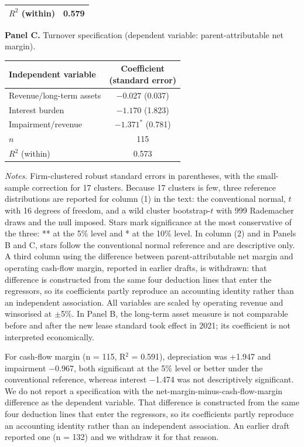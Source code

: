 \documentclass[review,3p,times]{elsarticle}
\begin{document}
\begin{table}[!htbp]
\begin{minipage}{\textwidth}
\begin{tabular}{@{}lc@{}}
$R^{2}$ (within) & 0.579 \\
\bottomrule
\end{tabular}
\par\medskip
\textbf{Panel C.} Turnover specification (dependent variable: parent-attributable net margin).
\par\smallskip
\begin{tabular}{@{}lc@{}}
\toprule
Independent variable & \shortstack{Coefficient\\(standard error)} \\
\midrule
Revenue/long-term assets & \shortstack{$-0.027$\\ (0.037)} \\
Interest burden & \shortstack{$-1.170$\\ (1.823)} \\
Impairment/revenue & \shortstack{$-1.371^{*}$\\ (0.781)} \\
$n$ & 115 \\
$R^{2}$ (within) & 0.573 \\
\bottomrule
\end{tabular}
\par\medskip
\raggedright
\noindent\textit{Notes.} Firm-clustered robust standard errors in parentheses, with the small-sample correction for 17 clusters. Because 17 clusters is few, three reference distributions are reported for column (1) in the text: the conventional normal, $t$ with 16 degrees of freedom, and a wild cluster bootstrap-$t$ with 999 Rademacher draws and the null imposed. Stars mark significance at the most conservative of the three: ** at the 5\% level and * at the 10\% level. In column (2) and in Panels B and C, stars follow the conventional normal reference and are descriptive only. A third column using the difference between parent-attributable net margin and operating cash-flow margin, reported in earlier drafts, is withdrawn: that difference is constructed from the same four deduction lines that enter the regressors, so its coefficients partly reproduce an accounting identity rather than an independent association. All variables are scaled by operating revenue and winsorised at $\pm$5\%. In Panel B, the long-term asset measure is not comparable before and after the new lease standard took effect in 2021; its coefficient is not interpreted economically.
\end{minipage}
\end{table}

For cash-flow margin (n = 115, R\ensuremath{^2} = 0.591), depreciation was +1.947 and impairment \ensuremath{-}0.967, both significant at the 5\% level or better under the conventional reference, whereas interest \ensuremath{-}1.474 was not descriptively significant. We do not report a specification with the net-margin-minus-cash-flow-margin difference as the dependent variable. That difference is constructed from the same four deduction lines that enter the regressors, so its coefficients partly reproduce an accounting identity rather than an independent association. An earlier draft reported one (n = 132) and we withdraw it for that reason.
\end{document}
